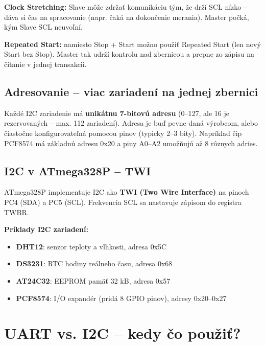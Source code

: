 \textbf{Clock Stretching:} Slave môže zdržať komunikáciu tým, že drží SCL nízko -- dáva si čas na spracovanie (napr. čaká na dokončenie merania). Master počká, kým Slave SCL neuvoľní.

\textbf{Repeated Start:} namiesto Stop + Start možno použiť Repeated Start (len nový Start bez Stop). Master tak udrží kontrolu nad zbernicou a prepne zo zápisu na čítanie v jednej transakcii.

\subsection{Adresovanie -- viac zariadení na jednej zbernici}

Každé I2C zariadenie má \textbf{unikátnu 7-bitovú adresu} (0--127, ale 16 je rezervovaných -- max. 112 zariadení). Adresa je buď pevne daná výrobcom, alebo čiastočne konfigurovateľná pomocou pinov (typicky 2--3 bity). Napríklad čip PCF8574 má základnú adresu 0x20 a piny A0--A2 umožňujú až 8 rôznych adries.

\subsection{I2C v ATmega328P -- TWI}

ATmega328P implementuje I2C ako \textbf{TWI (Two Wire Interface)} na pinoch PC4 (SDA) a PC5 (SCL). Frekvencia SCL sa nastavuje zápisom do registra TWBR.

\textbf{Príklady I2C zariadení:}
\begin{itemize}
    \item \textbf{DHT12}: senzor teploty a vlhkosti, adresa 0x5C
    \item \textbf{DS3231}: RTC hodiny reálneho času, adresa 0x68
    \item \textbf{AT24C32}: EEPROM pamäť 32 kB, adresa 0x57
    \item \textbf{PCF8574}: I/O expandér (pridá 8 GPIO pinov), adresy 0x20--0x27
\end{itemize}

\section{UART vs. I2C -- kedy čo použiť?}

